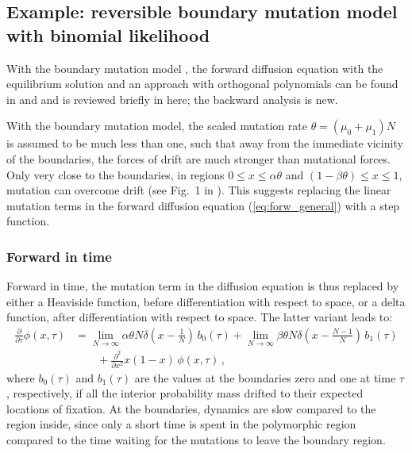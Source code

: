 \documentclass[preprint]{elsarticle}
\begin{document}
\subsection{Example: reversible boundary mutation model with binomial likelihood}

With the boundary mutation model \citep{Vogl15,Vogl16}, the forward diffusion equation with the equilibrium solution and an approach with orthogonal polynomials can be found in \citet{Vogl14b} and \citet{Vogl16} and is reviewed briefly in here; the backward analysis is new.

With the  boundary mutation model, the scaled mutation rate $\theta=(\mu_0+\mu_1)N$ is assumed to be much less than one, such that away from the immediate vicinity of the boundaries, the forces of drift are much stronger than mutational forces. Only very close to the boundaries, in regions $0\leq x \leq\alpha\theta$ and $(1-\beta\theta) \leq x \leq 1$, mutation can overcome drift (see Fig.~1 in \citet{Vogl15}). This suggests replacing the linear mutation terms in the forward diffusion equation (\ref{eq:forw_general}) with a step function.

\subsubsection{Forward in time}

Forward in time, the mutation term in the diffusion equation is thus replaced by either a Heaviside function, before differentiation with respect to space, or a delta function, after differentiation with respect to space. The latter variant leads to:
\begin{equation}\label{eq:forw_bounddrift}
\begin{split}
\frac{\partial}{\partial \tau} \phi(x,\tau)&=
    \lim_{N\to\infty}\alpha\theta N\delta(x-\tfrac1N) \,b_0(\tau)
    +\lim_{N\to\infty}\beta\theta N\delta(x-\tfrac{N-1}N) \,b_1(\tau)\\
    &\qquad+\frac{\partial^2}{\partial x^2}x(1-x)\,\phi(x,\tau)\,,
\end{split}
\end{equation}
where $b_0(\tau)$ and $b_1(\tau)$ are the values at the boundaries zero and one at time $\tau$, respectively, if all the interior probability mass drifted to their expected locations of fixation. At the boundaries, dynamics are slow compared to the region inside, since only a short time is spent in the polymorphic region compared to the time waiting for the mutations to leave the boundary region. 
\end{document}

